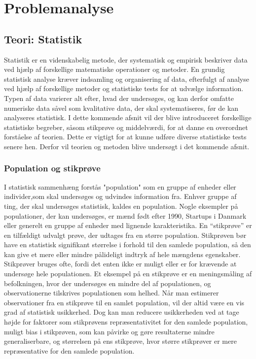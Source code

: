 \chapter{Problemanalyse}\label{ch:teori}
\section{Teori: Statistik}
Statistik er en videnskabelig metode, der systematisk og empirisk beskriver data ved hjælp af forskellige matematiske operationer og metoder. En grundig statistisk analyse kræver indsamling og organisering af data, efterfulgt af analyse ved hjælp af forskellige metoder og statistiske tests for at udvælge information. Typen af data varierer alt efter, hvad der undersøges, og kan derfor omfatte numeriske data såvel som kvalitative data, der skal systematiseres, før de kan analyseres statistisk. 
I dette kommende afsnit vil der blive introduceret forskellige statistiske begreber, såsom stikprøve og middelværdi, for at danne en overordnet forståelse af teorien. Dette er vigtigt for at kunne udføre diverse statistiske tests senere hen. Derfor vil teorien og metoden blive undersøgt i det kommende afsnit.

\subsection{Population og stikprøve}
I statistisk sammenhæng forstås "population" som en gruppe af enheder eller individer,som skal undersøges og udvindes information fra. Enhver gruppe af ting, der skal undersøges statistisk, kaldes en population. Nogle eksempler på populationer, der kan undersøges, er mænd født efter 1990, Startups i Danmark eller generelt en gruppe af enheder med lignende karakteristika.
En “stikprøve” er en tilfældigt udvalgt prøve, der udtages fra en større population. Stikprøven bør have en statistisk signifikant størrelse i forhold til den samlede population, så den kan give et mere eller mindre pålideligt indtryk af hele mængdens egenskaber. Stikprøver bruges ofte, fordi det enten ikke er muligt eller er for krævende at undersøge hele populationen. Et eksempel på en stikprøve er en meningsmåling af befolkningen, hvor der undersøges en mindre del af populationen, og observationerne tilskrives populationen som helhed.
Når man estimerer observationer fra en stikprøve til en samlet population, vil der altid være en vis grad af statistisk usikkerhed. Dog kan man reducere usikkerheden ved at tage højde for faktorer som stikprøvens repræsentativitet for den samlede population, muligt bias i stikprøven, som kan påvirke og gøre resultaterne mindre generaliserbare, og størrelsen på ens stikprøve, hvor større stikprøver er mere repræsentative for den samlede population.

